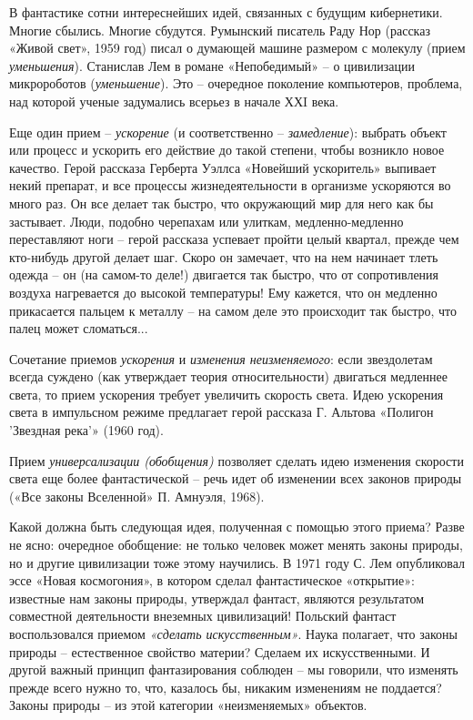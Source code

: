\documentclass[11pt,a4paper]{article}
\begin{document}
В фантастике сотни интереснейших идей, связанных с будущим кибернетики. Многие
сбылись. Многие сбудутся. Румынский писатель Раду Нор (рассказ «Живой свет»,
1959 год) писал о думающей машине размером с молекулу (прием
\emph{уменьшения}).  Станислав Лем в романе «Непобедимый» -- о цивилизации
микророботов (\emph{уменьшение}). Это -- очередное поколение компьютеров,
проблема, над которой ученые задумались всерьез в начале ХХI века.

Еще один прием -- \emph{ускорение} (и соответственно -- \emph{замедление}):
выбрать объект или процесс и ускорить его действие до такой степени, чтобы
возникло новое качество. Герой рассказа Герберта Уэллса «Новейший ускоритель»
выпивает некий препарат, и все процессы жизнедеятельности в организме
ускоряются во много раз. Он все делает так быстро, что окружающий мир для него
как бы застывает. Люди, подобно черепахам или улиткам, медленно-медленно
переставляют ноги -- герой рассказа успевает пройти целый квартал, прежде чем
кто-нибудь другой делает шаг. Скоро он замечает, что на нем начинает тлеть
одежда -- он (на самом-то деле!) двигается так быстро, что от сопротивления
воздуха нагревается до высокой температуры! Ему кажется, что он медленно
прикасается пальцем к металлу -- на самом деле это происходит так быстро, что
палец может сломаться...

Сочетание приемов \emph{ускорения} и \emph{изменения неизменяемого}: если
звездолетам всегда суждено (как утверждает теория относительности) двигаться
медленнее света, то прием ускорения требует увеличить скорость света. Идею
ускорения света в импульсном режиме предлагает герой рассказа Г. Альтова
«Полигон 'Звездная река'» (1960 год).

Прием \emph{универсализации (обобщения)} позволяет сделать идею изменения
скорости света еще более фантастической -- речь идет об изменении всех законов
природы («Все законы Вселенной» П. Амнуэля, 1968).

Какой должна быть следующая идея, полученная с помощью этого приема? Разве не
ясно: очередное обобщение: не только человек может менять законы природы, но и
другие цивилизации тоже этому научились. В 1971 году С. Лем опубликовал эссе
«Новая космогония», в котором сделал фантастическое «открытие»: известные нам
законы природы, утверждал фантаст, являются результатом совместной
деятельности внеземных цивилизаций! Польский фантаст воспользовался приемом
\emph{«сделать искусственным»}. Наука полагает, что законы природы --
естественное свойство материи? Сделаем их искусственными. И другой важный
принцип фантазирования соблюден -- мы говорили, что изменять прежде всего
нужно то, что, казалось бы, никаким изменениям не поддается? Законы природы --
из этой категории «неизменяемых» объектов.
\end{document}
